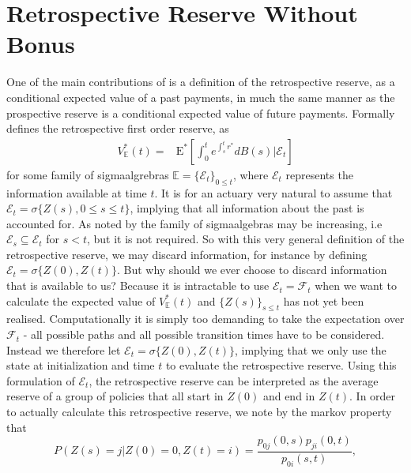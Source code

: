 \documentclass[12pt]{article}
\newcommand{\E}{\text{E}}
\newcommand{\indic}[1]{\mathds{1}_{ \{ #1 \} }}
\theoremstyle{my_thm}
\begin{document}
\section*{Retrospective Reserve Without Bonus}
One of the main contributions of \citet{Norberg} is a definition of the retrospective reserve, as a conditional expected value of a past payments, in much the same manner as the prospective reserve is a conditional expected value of future payments. Formally \citet{Norberg} defines the retrospective first order reserve, as
\begin{align*}
V^*_\mathbb{E}(t)=&\E^* \left[ \int_0^t e^{\int_s^t r^*} dB(s) \big| \mathcal{E}_t \right] 
\end{align*} 
for some family of sigmaalgrebras $\mathbb{E}=\{\mathcal{E}_t \}_{0\leq t}$, where $\mathcal{E}_t$ represents the information available at time $t$. It is for an actuary very natural to assume that $\mathcal{E}_t=\sigma\{ Z(s), 0 \leq s\leq t \}$, implying that all information about the past is accounted for. As noted by \citet{Norberg} the family of sigmaalgebras may be increasing, i.e $\mathcal{E}_s \subseteq \mathcal{E}_t$ for $s<t$, but it is not required. So with this very general definition of the retrospective reserve, we may discard information, for instance by defining $\mathcal{E}_t=\sigma \{Z(0), Z(t) \}$. But why should we ever choose to discard information that is available to us? Because it is intractable to use $\mathcal{E}_t=\mathcal{F}_t$ when we want to calculate the expected value of $V^*_\mathbb{E}(t)$ and $\{ Z(s) \}_{s\leq t}$ has not yet been realised. Computationally it is simply too demanding to take the expectation over $\mathcal{F}_t$ - all possible paths and all possible transition times have to be considered. Instead we therefore let $\mathcal{E}_t=\sigma \{Z(0), Z(t) \}$, implying that we only use the state at initialization and time $t$ to evaluate the retrospective reserve. Using this formulation of $\mathcal{E}_t$, the retrospective reserve can be interpreted as the average reserve of a group of policies that all start in $Z(0)$ and end in $Z(t)$. In order to actually calculate this retrospective reserve, we note by the markov property that
\begin{equation}
P(Z(s)=j| Z(0)=0, Z(t)=i )=\frac{p_{0j}(0,s)p_{ji}(0,t)}{p_{0i}(s,t)},
\label{eq:AAM}
\end{equation}
\end{document}
